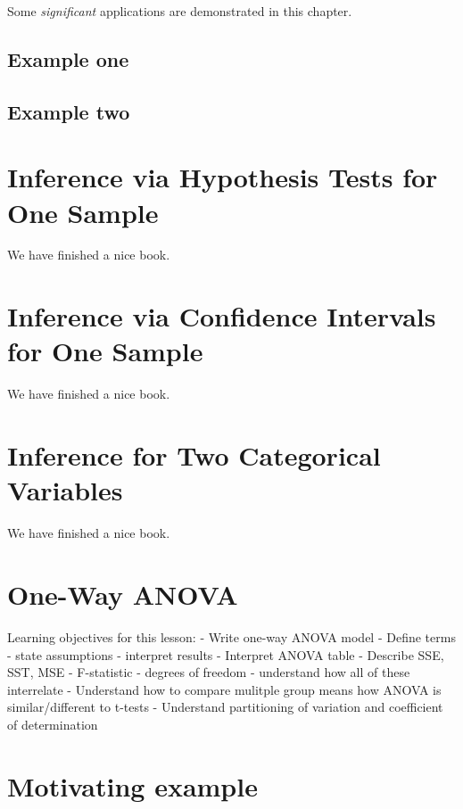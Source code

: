 \documentclass[]{book}
\begin{document}
Some \emph{significant} applications are demonstrated in this chapter.

\section{Example one}\label{example-one}

\section{Example two}\label{example-two}

\chapter{Inference via Hypothesis Tests for One Sample}\label{HT}

We have finished a nice book.

\chapter{Inference via Confidence Intervals for One Sample}\label{CI}

We have finished a nice book.

\chapter{Inference for Two Categorical Variables}\label{twocategorical}

We have finished a nice book.

\chapter{One-Way ANOVA}\label{anova}

Learning objectives for this lesson: - Write one-way ANOVA model -
Define terms - state assumptions - interpret results - Interpret ANOVA
table - Describe SSE, SST, MSE - F-statistic - degrees of freedom -
understand how all of these interrelate - Understand how to compare
mulitple group means how ANOVA is similar/different to t-tests -
Understand partitioning of variation and coefficient of determination

\chapter{Motivating example}\label{motivating-example}
\end{document}
